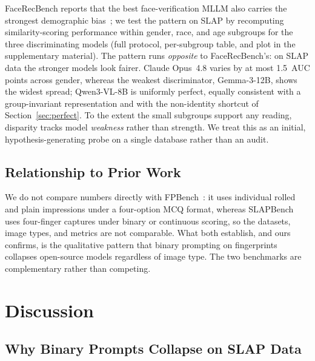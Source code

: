 \documentclass[runningheads]{llncs}
\begin{document}
FaceRecBench reports that the best face-verification MLLM also carries the
strongest demographic bias~\cite{facerecbench2025}; we test the pattern on
SLAP by recomputing similarity-scoring performance within gender, race, and
age subgroups for the three discriminating models (full protocol, per-subgroup
table, and plot in the supplementary material). The pattern runs
\emph{opposite} to FaceRecBench's: on SLAP data the stronger models look
fairer. Claude Opus~4.8 varies by at most 1.5~AUC points across gender, whereas
the weakest discriminator, Gemma-3-12B, shows the widest spread; Qwen3-VL-8B is
uniformly perfect, equally consistent with a group-invariant representation and
with the non-identity shortcut of Section~\ref{sec:perfect}. To the extent the
small subgroups support any reading, disparity tracks model \emph{weakness}
rather than strength. We treat this as an initial, hypothesis-generating probe
on a single database rather than an audit.

\subsection{Relationship to Prior Work}

We do not compare numbers directly with FPBench~\cite{fpbench2025}: it uses
individual rolled and plain impressions under a four-option MCQ format,
whereas SLAPBench uses four-finger captures under binary or continuous
scoring, so the datasets, image types, and metrics are not comparable. What
both establish, and ours confirms, is the qualitative pattern that binary
prompting on fingerprints collapses open-source models regardless of image
type. The two benchmarks are complementary rather than competing.

\section{Discussion}
\label{sec:discussion}

\subsection{Why Binary Prompts Collapse on SLAP Data}
\end{document}
